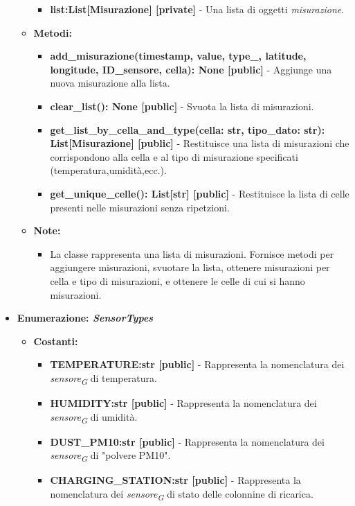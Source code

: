 \begin{itemize}
\begin{itemize}
\begin{itemize}
        \item \textbf{list:List[Misurazione] [private]} - Una lista di oggetti \textit{misurazione}.
    \end{itemize}
    \item \textbf{Metodi: }
    \begin{itemize}
        \item \textbf{add\_misurazione(timestamp, value, type\_, latitude, longitude, ID\_sensore, cella): None [public]} - Aggiunge una nuova misurazione alla lista.
        \item \textbf{clear\_list(): None [public]} - Svuota la lista di misurazioni.
        \item \textbf{get\_list\_by\_cella\_and\_type(cella: str, tipo\_dato: str): List[Misurazione] [public]} - Restituisce una lista di misurazioni che corrispondono alla cella e al tipo di misurazione specificati (temperatura,umidità,ecc.).
        \item \textbf{get\_unique\_celle(): List[str] [public]} - Restituisce la lista di celle presenti nelle misurazioni senza ripetzioni.
    \end{itemize}
    \item\textbf{Note:}
        \begin{itemize}
            \item La classe rappresenta una lista di misurazioni. Fornisce metodi per aggiungere misurazioni, svuotare la lista, ottenere misurazioni per cella e tipo di misurazioni, e ottenere le celle di cui si hanno misurazioni.
        \end{itemize}
    \end{itemize}
    \item\textbf{Enumerazione: \textit{SensorTypes}}
        \begin{itemize}
            \item \textbf{Costanti:} 
            \begin{itemize}
                \item \textbf{TEMPERATURE:str [public]} - Rappresenta la nomenclatura dei \textit{sensore}\textsubscript{\textit{G}} di temperatura.
                \item \textbf{HUMIDITY:str [public]} - Rappresenta la nomenclatura dei \textit{sensore}\textsubscript{\textit{G}} di umidità.
                \item \textbf{DUST\_PM10:str [public]} - Rappresenta la nomenclatura dei \textit{sensore}\textsubscript{\textit{G}} di "polvere PM10".
                \item \textbf{CHARGING\_STATION:str [public]} - Rappresenta la nomenclatura dei \textit{sensore}\textsubscript{\textit{G}} di stato delle colonnine di ricarica.

\end{itemize}
\end{itemize}
\end{itemize}
